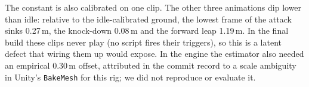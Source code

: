 The constant is also calibrated on one clip. The other three animations dip
lower than idle: relative to the idle-calibrated ground, the lowest frame of the
attack sinks 0.27\,m, the knock-down 0.08\,m and the forward leap 1.19\,m. In the
final build these clips never play (no script fires their triggers), so this is a
latent defect that wiring them up would expose. In the engine the
estimator also needed an empirical 0.30\,m offset, attributed in the commit
record to a scale ambiguity in Unity's \texttt{BakeMesh} for this rig; we did not
reproduce or evaluate it.


